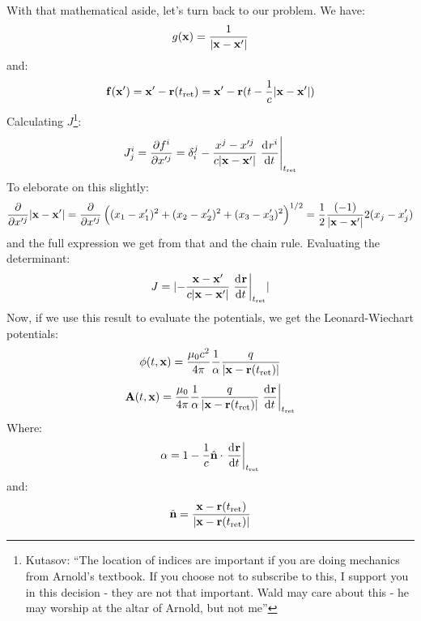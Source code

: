 With that mathematical aside, let's turn back to our problem. We have:
\begin{equation}
    g(\mathbf{x}) = \frac{1}{\lvert \mathbf{x} - \mathbf{x}' \rvert}
\end{equation}
and:
\begin{equation}
    \mathbf{f}(\mathbf{x}') = \mathbf{x}' - \mathbf{r}(t_{\text{ret}}) = \mathbf{x}' - \mathbf{r}(t - \frac{1}{c}\lvert \mathbf{x} - \mathbf{x}' \rvert)
\end{equation}
Calculating $J$\footnote{Kutasov: ``The location of indices are important if you are doing mechanics from Arnold's textbook. If you choose not to subscribe to this, I support you in this decision - they are not that important. Wald may care about this - he may worship at the altar of Arnold, but not me''}:
\begin{equation}
    J^i_j = \ddpd{f^i}{x'^j} = \delta^j_i - \frac{x^j - x'^j}{c\abs{\v{x} - \v{x}'}}\left.\dod{r^i}{t}\right|_{t_\text{ret}}
\end{equation}
To eleborate on this slightly:
\begin{equation}
    \frac{\partial }{\partial x'^j}\lvert \mathbf{x} - \mathbf{x}' \rvert = \frac{\partial }{\partial x'^j}\left((x_1 - x_1')^2+ (x_2 - x_2')^2 + (x_3 - x_3')^2\right)^{1/2} = \frac{1}{2}\frac{(-1)}{\lvert \mathbf{x} - \mathbf{x}' \rvert}2(x_j - x_j')
\end{equation}
and the full expression we get from that and the chain rule. Evaluating the determinant:
\begin{equation}
    J = \abs{-\frac{\v{x} - \v{x}'}{c\abs{\v{x} - \v{x}'}}\left.\dod{\v{r}}{t}\right|_{t_\text{ret}}}
\end{equation}
Now, if we use this result to evaluate the potentials, we get the Leonard-Wiechart potentials:
\begin{equation}
    \phi(t, \mathbf{x}) = \frac{\mu_0 c^2}{4\pi}\frac{1}{\alpha}\frac{q}{\lvert \mathbf{x} - \mathbf{r}(t_{\text{ret}}) \rvert}
\end{equation}
\begin{equation}
    \v{A}(t, \v{x}) = \frac{\mu_0}{4\pi}\frac{1}{\alpha}\frac{q}{\abs{\v{x} - \v{r}(t_{\text{ret}})}}\left.\dod{\v{r}}{t}\right|_{t_\text{ret}}
\end{equation}
Where:
\begin{equation}
    \alpha = 1 -\frac{1}{c}\hat{\v{n}}\cdot \left.\dod{\v{r}}{t}\right|_{t_\text{ret}}
\end{equation}
and:
\begin{equation}
    \hat{\mathbf{n}} = \frac{\mathbf{x} - \mathbf{r}(t_{\text{ret}})}{\lvert \mathbf{x} - \mathbf{r}(t_{\text{ret}}) \rvert}
\end{equation}
